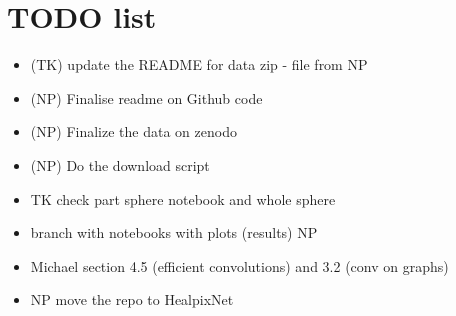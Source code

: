 \documentclass[final,twocolumn,3p,times,authoryear]{elsarticle}
\newcommand{\1}{\b{1}}              %
\newcommand{\0}{\b{0}}              %
\begin{document}
\section{TODO list}
\begin{itemize}[noitemsep,topsep=0pt,parsep=0pt,partopsep=0pt]

    \item (TK) update the README for data zip - file from NP
    \item (NP) Finalise readme on Github code
    \item (NP) Finalize the data on zenodo
    \item (NP) Do the download script
    \item TK check part sphere notebook and whole sphere
    \item branch with notebooks with plots (results) NP
    \item Michael section 4.5 (efficient convolutions) and 3.2 (conv on graphs)
    \item NP move the repo to HealpixNet



\end{itemize}
\end{document}
